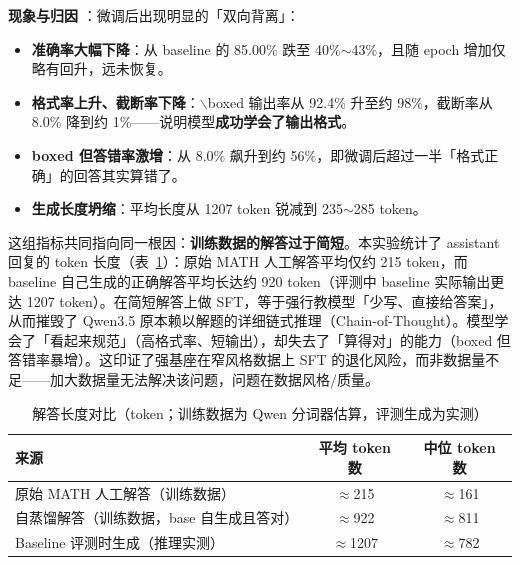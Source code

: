 \begin{table}[h]
\centering
\caption{Qwen3.5-4B LoRA 微调结果（测试集随机 1000 条，$T{=}0.7$）}
\label{tab:main}
\end{table}

\textbf{现象与归因} ：微调后出现明显的「双向背离」：
\begin{itemize}
  \item \textbf{准确率大幅下降}：从 baseline 的 85.00\% 跌至 40\%$\sim$43\%，且随 epoch 增加仅略有回升，远未恢复。
  \item \textbf{格式率上升、截断率下降}：$\backslash$boxed 输出率从 92.4\% 升至约 98\%，截断率从 8.0\% 降到约 1\%——说明模型\textbf{成功学会了输出格式}。
  \item \textbf{boxed 但答错率激增}：从 8.0\% 飙升到约 56\%，即微调后超过一半「格式正确」的回答其实算错了。
  \item \textbf{生成长度坍缩}：平均长度从 1207 token 锐减到 235$\sim$285 token。
\end{itemize}

这组指标共同指向同一根因：\textbf{训练数据的解答过于简短}。本实验统计了 assistant 回复的 token 长度（表~\ref{tab:len}）：原始 MATH 人工解答平均仅约 215 token，而 baseline 自己生成的正确解答平均长达约 920 token（评测中 baseline 实际输出更达 1207 token）。在简短解答上做 SFT，等于强行教模型「少写、直接给答案」，从而摧毁了 Qwen3.5 原本赖以解题的详细链式推理（Chain-of-Thought）。模型学会了「看起来规范」（高格式率、短输出），却失去了「算得对」的能力（boxed 但答错率暴增）。这印证了强基座在窄风格数据上 SFT 的退化风险，而非数据量不足——加大数据量无法解决该问题，问题在数据风格/质量。

\begin{table}[h]
\centering
\caption{解答长度对比（token；训练数据为 Qwen 分词器估算，评测生成为实测）}
\label{tab:len}
\begin{tabular}{lcc}
\hline
来源 & 平均 token 数 & 中位 token 数 \\
\hline
原始 MATH 人工解答（训练数据） & $\approx$215 & $\approx$161 \\
自蒸馏解答（训练数据，base 自生成且答对） & $\approx$922 & $\approx$811 \\
Baseline 评测时生成（推理实测） & $\approx$1207 & $\approx$782 \\
\hline
\end{tabular}
\end{table}

